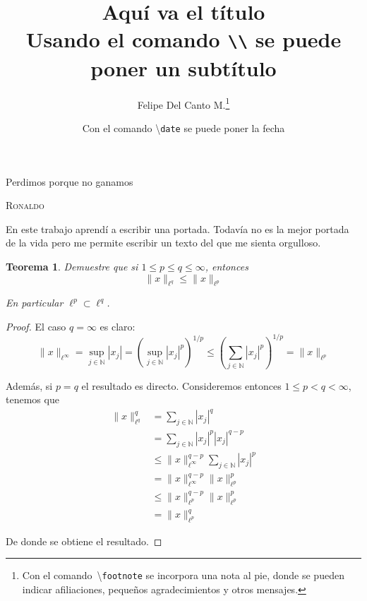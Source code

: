 \documentclass{article}
\author{Felipe Del Canto M.\footnote{Con el comando \textbackslash\texttt{footnote} se incorpora una nota al pie, donde se pueden indicar afiliaciones, pequeños agradecimientos y otros mensajes.}}
\title{Aquí va el título \\ Usando el comando \texttt{\textbackslash\textbackslash} se puede poner un subtítulo}
\date{Con el comando \textbackslash\texttt{date} se puede poner la fecha}
\newtheorem{teo}{Teorema}
\begin{document}
\begin{titlepage}
\thispagestyle{empty}
\maketitle

%
\vfill
\epigraph{Perdimos porque no ganamos}{\textsc{Ronaldo}}

\vfill
{\abstract En este trabajo aprendí a escribir una portada. Todavía no es la mejor portada de la vida pero me permite escribir un texto del que me sienta orgulloso.}
\vfill

\end{titlepage}

\begin{teo} Demuestre que si $1 \leq p \leq q \leq \infty$, entonces
	$$\|x\|_{\ell^{q}} \leq \|x\|_{\ell^{p}}$$
	
En particular $\ell^{p} \subset \ell^{q}$.
\end{teo}

\begin{proof} El caso $q = \infty$ es claro:
	$$\|x\|_{\ell^{\infty}} 
		= 	\sup_{j \in \mathbb{N}} |x_{j}|
		= 	\left(\sup_{j \in \mathbb{N}} |x_{j}|^{p}\right)^{1/p} 
		\leq	\left(\sum_{j \in \mathbb{N}} |x_{j}|^{p}\right)^{1/p} = \|x\|_{\ell^{p}}
	$$

Además, si $p = q$ el resultado es directo. Consideremos entonces $1 \leq p < q < \infty$, tenemos que
	\begin{align*}
		\|x\|_{\ell^{q}}^{q}
			&=		\sum_{j \in \mathbb{N}} |x_{j}|^{q}	\\
			&=		\sum_{j \in \mathbb{N}} |x_{j}|^{p} |x_{j}|^{q-p}	\\
			&\leq		\|x\|^{q-p}_{\ell^{\infty}} \sum_{j \in \mathbb{N}} |x_{j}|^{p}	\\
			&=		\|x\|^{q-p}_{\ell^{\infty}} \|x\|_{\ell^{p}}^{p}	\\
			&\leq		\|x\|^{q-p}_{\ell^{p}} \|x\|_{\ell^{p}}^{p}	\\
			&=		\|x\|_{\ell^{p}}^{q}		 
	\end{align*}

De donde se obtiene el resultado.
\end{proof}                                          
\end{document}
